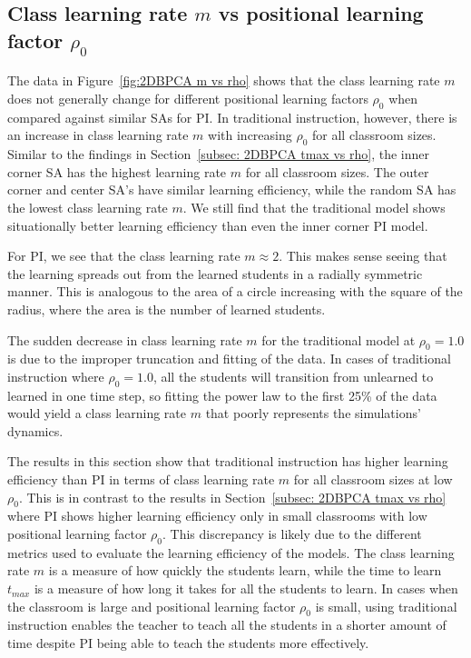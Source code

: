 \newpage

\subsection{Class learning rate $m$ vs positional learning factor $\rho_0$}

The data in Figure~\ref{fig:2DBPCA m vs rho} shows that the class learning rate $m$ does not generally change for different positional learning factors $\rho_0$ when compared against similar SAs for PI. 
In traditional instruction, however, there is an increase in class learning rate $m$ with increasing $\rho_0$ for all classroom sizes. 
Similar to the findings in Section~\ref{subsec: 2DBPCA tmax vs rho}, the inner corner SA has the highest learning rate $m$ for all classroom sizes. 
The outer corner and center SA's have similar learning efficiency, while the random SA has the lowest class learning rate $m$. We still find that the traditional model shows situationally better learning efficiency than even the inner corner PI model. 

For PI, we see that the class learning rate $m \approx 2$. This makes sense seeing that the learning spreads out from the learned students in a radially symmetric manner.
This is analogous to the area of a circle increasing with the square of the radius, where the area is the number of learned students.

The sudden decrease in class learning rate $m$ for the traditional model at $\rho_0 = 1.0$ is due to the improper truncation and fitting of the data. 
In cases of traditional instruction where $\rho_0 = 1.0$, all the students will transition from unlearned to learned in one time step, so fitting the power law to the first 25\% of the data would yield a class learning rate $m$ that poorly represents the simulations' dynamics.

The results in this section show that traditional instruction has higher learning efficiency than PI in terms of class learning rate $m$ for all classroom sizes at low $\rho_0$. 
This is in contrast to the results in Section~\ref{subsec: 2DBPCA tmax vs rho} where PI shows higher learning efficiency only in small classrooms with low positional learning factor $\rho_0$. 
This discrepancy is likely due to the different metrics used to evaluate the learning efficiency of the models. The class learning rate $m$ is a measure of how quickly the students learn, while the time to learn $t_{max}$ is a measure of how long it takes for all the students to learn. 
In cases when the classroom is large and positional learning factor $\rho_0$ is small, using traditional instruction enables the teacher to teach all the students in a shorter amount of time despite PI being able to teach the students more effectively. 

